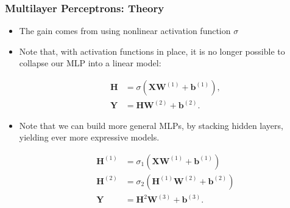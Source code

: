 \documentclass[
  shownotes,
  xcolor={svgnames},
  hyperref={colorlinks,citecolor=DarkBlue,linkcolor=DarkRed,urlcolor=DarkBlue}
  , aspectratio=169]{beamer}
\begin{document}
\begin{frame}
\frametitle{Multilayer Perceptrons: Theory}

\begin{itemize}
    \item The gain comes from using nonlinear activation function $\sigma$
    \item Note that, with activation functions in place, it is no longer possible to collapse our MLP into a linear model:

 \begin{align} 
 \mathbf{H} & = \sigma(\mathbf{X} \mathbf{W}^{(1)} + \mathbf{b}^{(1)}), \\ \nonumber
 \mathbf{Y} & = \mathbf{H}\mathbf{W}^{(2)} + \mathbf{b}^{(2)}.
 \end{align} 

\item Note that we can build more general MLPs, by stacking hidden layers, yielding ever more expressive models.

\begin{align}
\mathbf{H}^{(1)} &= \sigma_1(\mathbf{X} \mathbf{W}^{(1)} + \mathbf{b}^{(1)}) \\ \nonumber
\mathbf{H}^{(2)} &= \sigma_2(\mathbf{H}^{(1)} \mathbf{W}^{(2)} + \mathbf{b}^{(2)}) \\ \nonumber
\mathbf{Y} & = \mathbf{H}^{2}\mathbf{W}^{(3)} + \mathbf{b}^{(3)}.
\end{align}


\end{itemize}

\end{frame}
\end{document}
